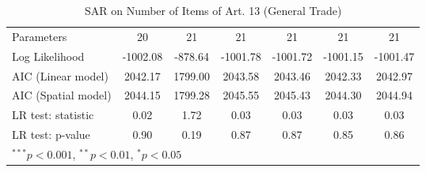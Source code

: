 \begin{table}[!h]
\begin{center}
\begin{tabular}{l c c c c c c }
Parameters              & 20           & 21           & 21           & 21           & 21           & 21           \\
Log Likelihood          & -1002.08     & -878.64      & -1001.78     & -1001.72     & -1001.15     & -1001.47     \\
AIC (Linear model)      & 2042.17      & 1799.00      & 2043.58      & 2043.46      & 2042.33      & 2042.97      \\
AIC (Spatial model)     & 2044.15      & 1799.28      & 2045.55      & 2045.43      & 2044.30      & 2044.94      \\
LR test: statistic      & 0.02         & 1.72         & 0.03         & 0.03         & 0.03         & 0.03         \\
LR test: p-value        & 0.90         & 0.19         & 0.87         & 0.87         & 0.85         & 0.86         \\
\bottomrule
\multicolumn{7}{l}{\scriptsize{$^{***}p<0.001$, $^{**}p<0.01$, $^*p<0.05$}}
\end{tabular}
\caption{SAR on Number of Items of Art. 13 (General Trade)}
\label{table:coefficients}
\end{center}
\end{table}
